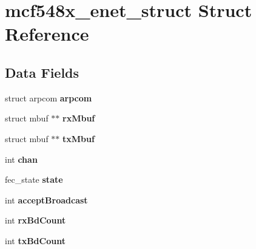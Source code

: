 \hypertarget{structmcf548x__enet__struct}{}\section{mcf548x\+\_\+enet\+\_\+struct Struct Reference}
\label{structmcf548x__enet__struct}
\subsection*{Data Fields}
\begin{DoxyCompactItemize}
\item 
\mbox{\label{structmcf548x__enet__struct_ac5902109f23c9cc0cde944cb1e54265d}} 
struct arpcom {\bfseries arpcom}
\item 
\mbox{\label{structmcf548x__enet__struct_a2704f9d57c30c96a69efee7da40e7b8b}} 
struct mbuf $\ast$$\ast$ {\bfseries rx\+Mbuf}
\item 
\mbox{\label{structmcf548x__enet__struct_a9cf621958e580ee9ca72b0db4ebbdf18}} 
struct mbuf $\ast$$\ast$ {\bfseries tx\+Mbuf}
\item 
\mbox{\label{structmcf548x__enet__struct_ab73c06302ffeb7b6f06a8537cc518954}} 
int {\bfseries chan}
\item 
\mbox{\label{structmcf548x__enet__struct_a549d59777c66520ffb9b99eb2c1583c4}} 
fec\+\_\+state {\bfseries state}
\item 
\mbox{\label{structmcf548x__enet__struct_a3cac4e279a9c5e28164948e04faa6338}} 
int {\bfseries accept\+Broadcast}
\item 
\mbox{\label{structmcf548x__enet__struct_ab34f6d8548e473410370ffdbe01a592d}} 
int {\bfseries rx\+Bd\+Count}
\item 
\mbox{\label{structmcf548x__enet__struct_a43080f81f3ed288bce445a1329232408}} 
int {\bfseries tx\+Bd\+Count}
\item 
\mbox{\label{structmcf548x__enet__struct_aa576d5aad971e568e6bee9f787535069}} 

\end{DoxyCompactItemize}
